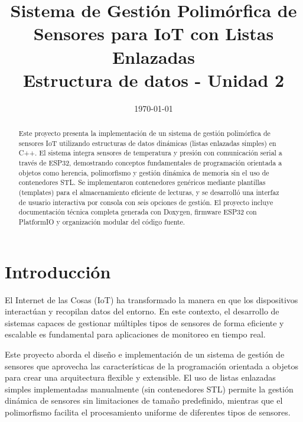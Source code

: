 \documentclass[conference]{IEEEtran}
\date{\specialdate\today}
\begin{document}
\newcommand{\breite}{1.0}
\newcommand{\RelacionFiguradoscolumnas}{0.9}
\newcommand{\RelacionFiguradoscolumnasPuntoCinco}{0.45}

\title{Sistema de Gestión Polimórfica de Sensores para IoT con Listas Enlazadas\\
\large Estructura de datos - Unidad 2}

\author{
}

\maketitle

\begin{abstract}
Este proyecto presenta la implementación de un sistema de gestión polimórfica de sensores IoT utilizando estructuras de datos dinámicas (listas enlazadas simples) en C++. El sistema integra sensores de temperatura y presión con comunicación serial a través de ESP32, demostrando conceptos fundamentales de programación orientada a objetos como herencia, polimorfismo y gestión dinámica de memoria sin el uso de contenedores STL. Se implementaron contenedores genéricos mediante plantillas (templates) para el almacenamiento eficiente de lecturas, y se desarrolló una interfaz de usuario interactiva por consola con seis opciones de gestión. El proyecto incluye documentación técnica completa generada con Doxygen, firmware ESP32 con PlatformIO y organización modular del código fuente.
\end{abstract}

\section{Introducción}

El Internet de las Cosas (IoT) ha transformado la manera en que los dispositivos interactúan y recopilan datos del entorno. En este contexto, el desarrollo de sistemas capaces de gestionar múltiples tipos de sensores de forma eficiente y escalable es fundamental para aplicaciones de monitoreo en tiempo real.

Este proyecto aborda el diseño e implementación de un sistema de gestión de sensores que aprovecha las características de la programación orientada a objetos para crear una arquitectura flexible y extensible. El uso de listas enlazadas simples implementadas manualmente (sin contenedores STL) permite la gestión dinámica de sensores sin limitaciones de tamaño predefinido, mientras que el polimorfismo facilita el procesamiento uniforme de diferentes tipos de sensores.
\end{document}
